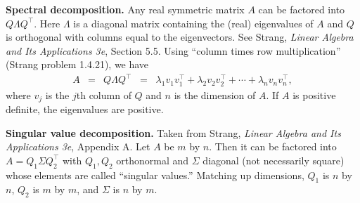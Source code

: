 \documentclass[11pt]{article}
\begin{document}
{\bf Spectral decomposition.}
Any real symmetric matrix $A$ can be factored into $ Q \Lambda Q^\top$.
Here $\Lambda$ is a diagonal matrix containing the (real) eigenvalues of $A$
and $Q$ is orthogonal with columns equal to the eigenvectors.
See Strang, {\it Linear Algebra and Its Applications 3e\/}, Section 5.5.
Using ``column times row multiplication'' (Strang problem 1.4.21),
we have
\begin{eqnarray*}
    A &=& Q \Lambda Q^\top
        \;\;=\;\; \lambda_1 v_1 v_1^\top + \lambda_2 v_2 v_2^\top  + \cdots
            + \lambda_n v_n v_n^\top ,
\end{eqnarray*}
where $v_j$ is the $j$th column of $Q$ and $n$ is the dimension of $A$.
If $A$ is positive definite, the eigenvalues are positive.

{\bf Singular value decomposition.}
Taken from Strang, {\it Linear Algebra and Its Applications 3e\/}, Appendix A.
Let $A$ be $m$ by $n$.
Then it can be factored into $A = Q_1 \Sigma Q_2^\top $
with $Q_1, Q_2$ orthonormal and $\Sigma$ diagonal (not necessarily square) whose elements
are called ``singular values.''
Matching up dimensions, $Q_1$ is $n$ by $n$,
$Q_2$ is $m$ by $m$,
and $\Sigma$ is $n$ by $m$.
\end{document}
